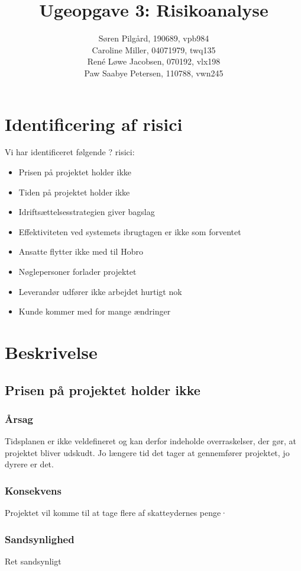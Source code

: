 \documentclass[10pt,a4paper,danish]{article}
\title{Ugeopgave 3: Risikoanalyse}
\author{Søren Pilgård, 190689, vpb984\\
Caroline Miller, 04071979, twq135\\
René Løwe Jacobsen, 070192, vlx198\\
Paw Saabye Petersen, 110788, vwn245}
\begin{document}
\maketitle
\newpage


\section{Identificering af risici}
Vi har identificeret følgende ? risici:
\begin{itemize}
\item Prisen på projektet holder ikke
\item Tiden på projektet holder ikke
\item Idriftsættelsesstrategien giver bagslag
\item Effektiviteten ved systemets ibrugtagen er ikke som forventet
\item Ansatte flytter ikke med til Hobro 
\item Nøglepersoner forlader projektet
\item Leverandør udfører ikke arbejdet hurtigt nok
\item Kunde kommer med for mange ændringer
\end{itemize}

\section{Beskrivelse}

\subsection{Prisen på projektet holder ikke}
\subsubsection{Årsag}
Tidsplanen er ikke veldefineret og kan derfor indeholde overraskelser, der gør, at projektet bliver udskudt. Jo længere tid det tager at gennemfører projektet, jo dyrere er det.
\subsubsection{Konsekvens}
Projektet vil komme til at tage flere af skatteydernes penge·
\subsubsection{Sandsynlighed}
Ret sandsynligt %
\end{document}
